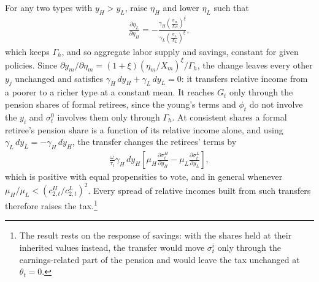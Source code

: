 For any two types with $y_H > y_L$, raise $\eta_H$ and lower $\eta_L$ such that
\begin{align*}
    \frac{\partial \eta_L}{\partial \eta_H} = - \frac{\gamma_H \left(\frac{\eta_H}{X_H}\right)^{\xi}}{\gamma_L \left(\frac{\eta_L}{X_L}\right)^{\xi}},
\end{align*}
which keeps $\Gamma_h$, and so aggregate labor supply and savings, constant for given policies. Since $\partial y_m/\partial\eta_m = (1+\xi)(\eta_m/X_m)^{\xi}/\Gamma_h$, the change leaves every other $y_j$ unchanged and satisfies $\gamma_H\,dy_H+\gamma_L\,dy_L = 0$: it transfers relative income from a poorer to a richer type at a constant mean. It reaches $G_t$ only through the pension shares of formal retirees, since the young's terms and $\phi_t$ do not involve the $y_i$ and $\sigma_t^0$ involves them only through $\Gamma_h$. At consistent shares a formal retiree's pension share is a function of its relative income alone, and using $\gamma_L\,dy_L = -\gamma_H\,dy_H$, the transfer changes the retirees' terms by
\begin{align*}
    \frac{\omega}{\tau_t}\gamma_H\,dy_H\left[\mu_H\frac{\partial\sigma_t^H}{\partial y_H}-\mu_L\frac{\partial\sigma_t^L}{\partial y_L}\right],
\end{align*}
which is positive with equal propensities to vote, and in general whenever $\mu_H/\mu_L < (c_{2,t}^H/c_{2,t}^L)^2$. Every spread of relative incomes built from such transfers therefore raises the tax.\footnote{The result rests on the response of savings: with the shares held at their inherited values instead, the transfer would move $\sigma_t^i$ only through the earnings-related part of the pension and would leave the tax unchanged at $\theta_t = 0$.} 

